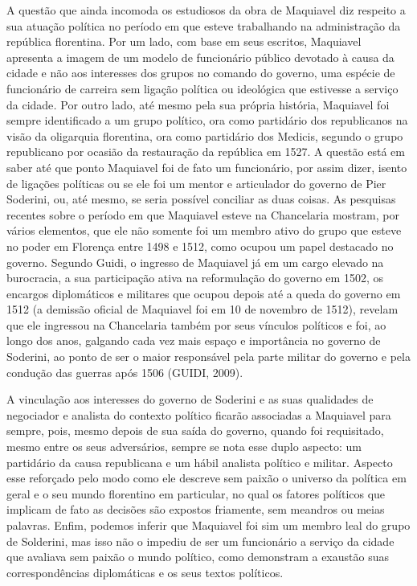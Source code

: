 A questão que ainda incomoda os estudiosos da obra de Maquiavel diz
respeito a sua atuação política no período em que esteve trabalhando na
administração da república florentina. Por um lado, com base em seus
escritos, Maquiavel apresenta a imagem de um modelo de funcionário
público devotado à causa da cidade e não aos interesses dos grupos no
comando do governo, uma espécie de funcionário de carreira sem ligação
política ou ideológica que estivesse a serviço da cidade\emph{.} Por
outro lado, até mesmo pela sua própria história, Maquiavel foi sempre
identificado a um grupo político, ora como partidário dos republicanos
na visão da oligarquia florentina, ora como partidário dos Medicis,
segundo o grupo republicano por ocasião da restauração da república em
1527. A questão está em saber até que ponto Maquiavel foi de fato um
funcionário, por assim dizer, isento de ligações políticas ou se ele foi
um mentor e articulador do governo de Pier Soderini, ou, até mesmo, se
seria possível conciliar as duas coisas. As pesquisas recentes sobre o
período em que Maquiavel esteve na Chancelaria mostram, por vários
elementos, que ele não somente foi um membro ativo do grupo que esteve
no poder em Florença entre 1498 e 1512, como ocupou um papel destacado
no governo. Segundo Guidi, o ingresso de Maquiavel já em um cargo
elevado na burocracia, a sua participação ativa na reformulação do
governo em 1502, os encargos diplomáticos e militares que ocupou depois
até a queda do governo em 1512 (a demissão oficial de Maquiavel foi em
10 de novembro de 1512), revelam que ele ingressou na Chancelaria também
por seus vínculos políticos e foi, ao longo dos anos, galgando cada vez
mais espaço e importância no governo de Soderini, ao ponto de ser o
maior responsável pela parte militar do governo e pela condução das
guerras após 1506 (GUIDI, 2009).

A vinculação aos interesses do governo de Soderini e as suas qualidades
de negociador e analista do contexto político ficarão associadas a
Maquiavel para sempre, pois, mesmo depois de sua saída do governo,
quando foi requisitado, mesmo entre os seus adversários, sempre se nota
esse duplo aspecto: um partidário da causa republicana e um hábil
analista político e militar. Aspecto esse reforçado pelo modo como ele
descreve sem paixão o universo da política em geral e o seu mundo
florentino em particular, no qual os fatores políticos que implicam de
fato as decisões são expostos friamente, sem meandros ou meias palavras.
Enfim, podemos inferir que Maquiavel foi sim um membro leal do grupo de
Solderini, mas isso não o impediu de ser um funcionário a serviço da
cidade que avaliava sem paixão o mundo político, como demonstram a
exaustão suas correspondências diplomáticas e os seus textos políticos.

